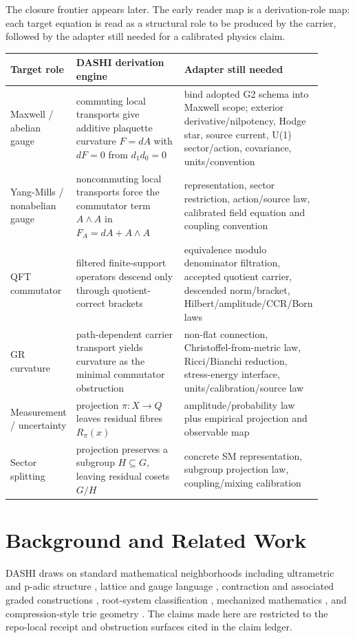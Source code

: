 \documentclass[11pt]{article}
\theoremstyle{definition}
\theoremstyle{plain}
\theoremstyle{remark}
\begin{document}
The closure frontier appears later. The early reader map is a derivation-role
map: each target equation is read as a structural role to be produced by the
carrier, followed by the adapter still needed for a calibrated physics claim.
\begin{center}
\small
\begin{tabular}{p{0.20\linewidth}p{0.38\linewidth}p{0.32\linewidth}}
\toprule
Target role & DASHI derivation engine & Adapter still needed \\
\midrule
Maxwell / abelian gauge & commuting local transports give additive plaquette curvature \(F=dA\) with \(dF=0\) from \(d_1d_0=0\) & bind adopted G2 schema into Maxwell scope; exterior derivative/nilpotency, Hodge star, source current, U(1) sector/action, covariance, units/convention \\
Yang-Mills / nonabelian gauge & noncommuting local transports force the commutator term \(A\wedge A\) in \(F_A=dA+A\wedge A\) & representation, sector restriction, action/source law, calibrated field equation and coupling convention \\
QFT commutator & filtered finite-support operators descend only through quotient-correct brackets & equivalence modulo denominator filtration, accepted quotient carrier, descended norm/bracket, Hilbert/amplitude/CCR/Born laws \\
GR curvature & path-dependent carrier transport yields curvature as the minimal commutator obstruction & non-flat connection, Christoffel-from-metric law, Ricci/Bianchi reduction, stress-energy interface, units/calibration/source law \\
Measurement / uncertainty & projection \(\pi:X\to Q\) leaves residual fibres \(R_\pi(x)\) & amplitude/probability law plus empirical projection and observable map \\
Sector splitting & projection preserves a subgroup \(H\subseteq G\), leaving residual cosets \(G/H\) & concrete SM representation, subgroup projection law, coupling/mixing calibration \\
\bottomrule
\end{tabular}
\end{center}


\section{Background and Related Work}

DASHI draws on standard mathematical neighborhoods including ultrametric and
p-adic structure \cite{schikhof-1984,vladimirov-volovich-zelenov-1994},
lattice and gauge language
\cite{nakahara-2003,wilson-1974,kogut-1979}, contraction and associated
graded constructions \cite{weibel-1994}, root-system classification
\cite{humphreys-1972},
mechanized mathematics \cite{norell-2007,hott-book,plfa-agda}, and
compression-style trie geometry \cite{rissanen-1978,grunwald-2007}. The
claims made here are restricted to the repo-local receipt and obstruction
surfaces cited in the claim ledger.
\end{document}
